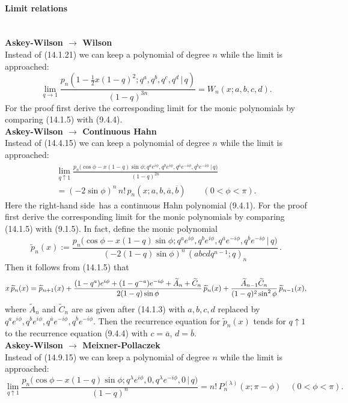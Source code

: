\documentclass[twoside,11pt]{article}
\newcommand\sa{\smallskipamount}
\newcommand\sLP{\\[\sa]}
\newcommand\ba{\bigskipamount}
\newcommand\bLP{\\[\ba]}
\newcommand\la\lambda
\newcommand\thalf{\tfrac12}
\newcommand\wt{\widetilde}
\newcommand\RHS{right-hand side}
\begin{document}
\paragraph{Limit relations}\quad\sLP
{\bf Askey-Wilson $\longrightarrow$ Wilson}\\
Instead of (14.1.21) we can keep a polynomial of degree $n$ while the limit is approached:
\begin{equation}
\lim_{q\to1}\frac{p_n(1-\thalf x(1-q)^2;q^a,q^b,q^c,q^d\,|\, q)}{(1-q)^{3n}}
=W_n(x;a,b,c,d).
\label{109}
\end{equation}
For the proof first derive the corresponding limit for the monic polynomials by comparing
(14.1.5) with (9.4.4).
\bLP
{\bf Askey-Wilson $\longrightarrow$ Continuous Hahn}\\
Instead of (14.4.15) we can keep a polynomial of degree $n$ while the limit is approached:
\begin{multline}
\lim_{q\uparrow1}
\frac{p_n\big(\cos\phi-x(1-q)\sin\phi;q^a e^{i\phi},q^b e^{i\phi},q^{\overline a} e^{-i\phi},
q^{\overline b} e^{-i\phi}\,|\, q\big)}
{(1-q)^{2n}}\\
=(-2\sin\phi)^n\,n!\,p_n(x;a,b,\overline a,\overline b)\qquad
(0<\phi<\pi).
\label{177}
\end{multline}
Here the \RHS\ has a continuous Hahn polynomial (9.4.1).
For the proof first derive the corresponding limit for the monic polynomials by comparing
(14.1.5) with (9.1.5).
In fact, define the monic polynomial
\[
\wt p_n(x):=
\frac{p_n\big(\cos\phi-x(1-q)\sin\phi;q^a e^{i\phi},q^b e^{i\phi},q^{\overline a} e^{-i\phi},
q^{\overline b} e^{-i\phi}\,|\, q\big)}
{(-2(1-q)\sin\phi)^n\,(abcdq^{n-1};q)_n}\,.
\]
Then it follows from (14.1.5) that
\begin{equation*}
x\,\wt p_n(x)=\wt p_{n+1}(x)
+\frac{(1-q^a)e^{i\phi}+(1-q^{-a})e^{-i\phi}+\wt A_n+\wt C_n}{2(1-q)\sin\phi}\,\wt p_n(x)\\
+\frac{\wt A_{n-1} \wt C_n}{(1-q)^2 \sin^2\phi}\,\wt p_{n-1}(x),
\end{equation*}
where $\wt A_n$ and $\wt C_n$ are as given after (14.1.3) with $a,b,c,d$ replaced by
$q^a e^{i\phi},q^b e^{i\phi},q^{\overline a} e^{-i\phi},q^{\overline b} e^{-i\phi}$.
Then the recurrence equation for $\wt p_n(x)$ tends for $q\uparrow 1$ to
the recurrence equation (9.4.4) with $c=\overline a$, $d=\overline b$.
\bLP
{\bf Askey-Wilson $\longrightarrow$ Meixner-Pollaczek}\\
Instead of (14.9.15) we can keep a polynomial of degree $n$ while the limit is approached:
\begin{equation}
\lim_{q\uparrow1}
\frac{p_n\big(\cos\phi-x(1-q)\sin\phi;
q^\la e^{i\phi},0,q^\la e^{-i\phi},0\,|\, q\big)}{(1-q)^n}
=n!\,P_n^{(\la)}(x;\pi-\phi)\quad
(0<\phi<\pi).
\label{178}
\end{equation}
\end{document}
